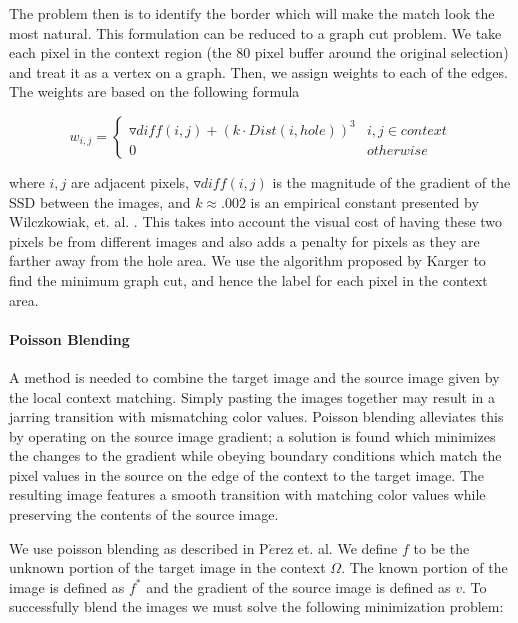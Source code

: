 \documentclass[11pt]{amsart}
\begin{document}
The problem then is to identify the border which will make the match look the most natural. This formulation can be reduced to a graph cut problem. We take each pixel in the context region (the 80 pixel buffer around the original selection) and treat it as a vertex on a graph. Then, we assign weights to each of the edges. The weights are based on the following formula

\begin{displaymath}
	w_{i,j} = \left\{ 
		\begin{array}{lr}
			\triangledown diff(i,j) + (k \cdot Dist(i,hole))^3 &  i,j \in context \\
			0 &  otherwise
		\end{array}
	\right.
\end{displaymath}

where $i,j$ are adjacent pixels, $\triangledown diff(i,j)$ is the magnitude of the gradient of the SSD between the images, and $k \approx .002$ is an empirical constant presented by Wilczkowiak, et. al. \cite{Gabriel:2005}. This takes into account the visual cost of having these two pixels be from different images and also adds a penalty for pixels as they are farther away from the hole area. We use the algorithm proposed by Karger \cite{Karger:1992} to find the minimum graph cut, and hence the label for each pixel in the context area.

\paragraph{\sc Poisson Blending}



A method is needed to combine the target image and the source image given by the local context matching. Simply pasting the images together may result in a jarring transition with mismatching color values. Poisson blending alleviates this by operating on the source image gradient; a solution is found which minimizes the changes to the gradient while obeying boundary conditions which match the pixel values in the source on the edge of the context to the target image. The resulting image features a smooth transition with matching color values while preserving the contents of the source image.


We use poisson blending as described in P$\acute{e}$rez et. al. \cite{Perez:2003} We define $f$ to be the unknown portion of the target image in the context $\Omega$. The known portion of the image is defined as $f^\ast$ and the gradient of the source image is defined as $v$. To successfully blend the images we must solve the following minimization problem:
\end{document}
